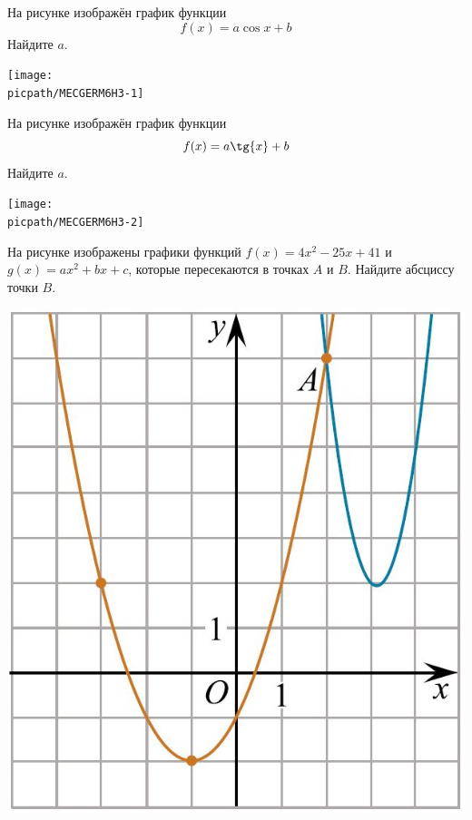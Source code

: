 %
%

\begin{class}[number=1]
	\begin{listofex}
		\item
		\begin{minipage}[t]{\bodywidth}
			На рисунке изображён график функции \[ f(x)=a \cos{x}+b \] Найдите \(a\).
		\end{minipage}
		\hspace{0.02\linewidth}
		\begin{minipage}[t]{\picwidth}
			\texttt{[image: \\picpath/MECGERM6H3-1]}
		\end{minipage}
		\item
		\begin{minipage}[t]{\bodywidth}
			На рисунке изображён график функции \[ f(x)=a \tg{x}+b \] Найдите \(a\).
		\end{minipage}
		\hspace{0.02\linewidth}
		\begin{minipage}[t]{\picwidth}
			\texttt{[image: \\picpath/MECGERM6H3-2]}
		\end{minipage}
		\item %
		\begin{minipage}[t]{\bodywidth}
			На рисунке изображены графики функций \(f(x) = 4x^2-25x+41 \) и \( g(x)=ax^2+bx+c \), которые пересекаются в точках \(A\) и \(B\). Найдите абсциссу точки \(B\).
		\end{minipage}
		\hspace{0.02\linewidth}
		\begin{minipage}[t]{\picwidth}
			\includegraphics[align=t, width=\linewidth]{../pics/G112M3C1-10}

\end{minipage}
\end{listofex}
\end{class}

